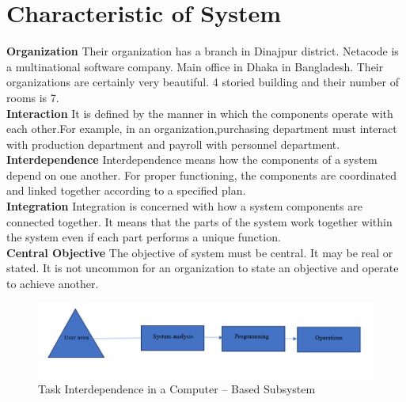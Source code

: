 \documentclass[a4paper,12pt]{report}
\begin{document}
\section {Characteristic of System}
\textbf{Organization}
Their organization has a branch in Dinajpur district. Netacode is a multinational software company. Main office in Dhaka in Bangladesh. Their organizations are certainly very beautiful. 4 storied building and their number of rooms is 7.\\

\textbf{Interaction}
It is defined by the manner in which the components operate with each other.For example, in an organization,purchasing department must interact with production department and payroll with personnel department.\\

\textbf{Interdependence}
Interdependence means how the components of a system depend on one another. For proper functioning, the components are coordinated and linked together according to a specified plan. \\

\textbf{Integration}
Integration is concerned with how a system components are connected together. It means that the parts of the system work together within the system even if each part performs a unique function.\\

\textbf{Central Objective}
The objective of system must be central. It may be real or stated. It is not uncommon for an organization to state an objective and operate to achieve another.\\
\begin{figure}[h]
	\centering
	\includegraphics[width=0.7\linewidth]{1}
	\caption{Task Interdependence in a Computer – Based Subsystem }
	\label{fig:1}
\end{figure}
\end{document}
